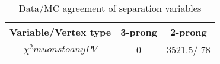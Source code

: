 \documentclass{article}
\begin{document}
\begin{table}[htbp]
\caption{\label{tab:sepVars}Data/MC agreement of separation variables}
\begin{center}
\begin{tabular}{c|c|c}
Variable/Vertex type & 3-prong & 2-prong\\
\hline
$\chi^{2} muons to any PV$ & 0 & 3521.5/ 78\\
\hline
\end{tabular}
\end{center}
\end{table}
\end{document}
